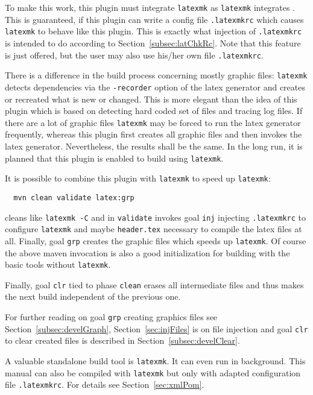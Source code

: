 To make this work, this plugin must integrate \texttt{latexmk} 
as \texttt{latexmk} integrates \lualatex{}. 
This is guaranteed, if this plugin can write a config file \texttt{.latexmkrc} 
which causes \texttt{latexmk} to behave like this plugin. 
This is exactly what injection of \texttt{.latexmkrc} is intended to do 
according to Section~\ref{subsec:latChkRc}. 
Note that this feature is just offered, 
but the user may also use his/her own file \texttt{.latexmkrc}. 

There is a difference in the build process concerning mostly graphic files: 
\texttt{latexmk} detects dependencies via the \texttt{-recorder} option of the latex generator 
and creates or recreated what is new or changed. 
This is more elegant than the idea of this plugin 
which is based on detecting hard coded set of files 
and tracing log files. 
If there are a lot of graphic files 
\texttt{latexmk} may be forced to run the latex generator frequently, 
whereas this plugin first creates all graphic files and then invokes the latex generator. 
Nevertheless, the results shall be the same. 
In the long run, it is planned that this plugin is enabled to build using \texttt{latexmk}. 

It is possible to combine this plugin with \texttt{latexmk} to speed up \texttt{latexmk}: 
%
\begin{Verbatim}
  mvn clean validate latex:grp
\end{Verbatim}
%
cleans like \texttt{latexmk -C} and in \texttt{validate} 
invokes goal \texttt{inj} injecting \texttt{.latexmkrc} to configure \texttt{latexmk} 
and maybe \texttt{header.tex} necessary to compile the latex files at all. 
Finally, goal \texttt{grp} creates the graphic files which speeds up \texttt{latexmk}. 
Of course the above maven invocation is also a good initialization 
for building with the basic tools without \texttt{latexmk}. 

Finally, goal \texttt{clr} tied to phase \texttt{clean} erases all intermediate files 
and thus makes the next build independent of the previous one. 


For further reading on goal \texttt{grp} creating graphics files 
see Section~\ref{subsec:develGraph}, 
Section~\ref{sec:injFiles} is on file injection and 
goal \texttt{clr} to clear created files is 
described in Section~\ref{subsec:develClear}. 


A valuable standalone build tool is \texttt{latexmk}. 
It can even run in background. 
This manual can also be compiled with \texttt{latexmk} 
but only with adapted configuration file \texttt{.latexmkrc}. 
For details see Section~\ref{sec:xmlPom}. 
\medskip



